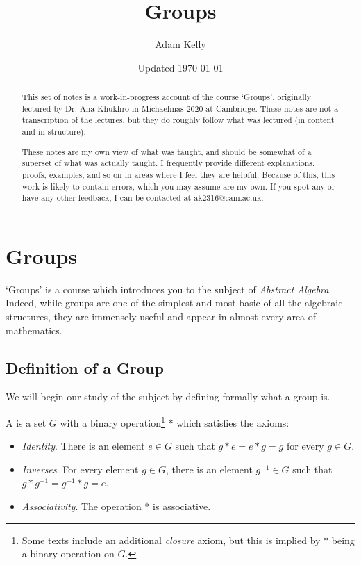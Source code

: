 \documentclass[a4]{scrreprt}
\title{Groups}
\author{Adam Kelly}
\date{Updated \today}
\newcommand{\newchapter}{\chapter}
\newcommand{\newsection}{\section}
\begin{document}
\maketitle

\begin{abstract}
	This set of notes is a work-in-progress account of the course `Groups', originally lectured by Dr. Ana Khukhro in Michaelmas 2020 at Cambridge. These notes are not a transcription of the lectures, but they do roughly follow what was lectured (in content and in structure).

	These notes are my own view of what was taught, and should be somewhat of a superset of what was actually taught. I frequently provide different explanations, proofs, examples, and so on in areas where I feel they are helpful. Because of this, this work is likely to contain errors, which you may assume are my own. If you spot any or have any other feedback, I can be contacted at \href{mailto:ak2316@cam.ac.uk}{ak2316@cam.ac.uk}.
\end{abstract}

\tableofcontents



\newchapter{Groups}

`Groups' is a course which introduces you to the subject of \emph{Abstract Algebra}.
Indeed, while groups are one of the simplest and most basic of all the algebraic structures, they are immensely useful and appear in almost every area of mathematics. 

\newsection{Definition of a Group}

We will begin our study of the subject by defining formally what a group is.

\begin{definition}[Group]
	A  is a set $G$ with a binary operation\footnote{Some texts include an additional \emph{closure} axiom, but this is implied by $*$ being a binary operation on $G$.} $*$ which satisfies the axioms:
	\begin{itemize}
		\item \emph{Identity}. There is an element $e \in G$ such that $g * e = e * g = g$ for every $g \in G$.
		\item \emph{Inverses}. For every element $g \in G$, there is an element $g^{-1} \in G$ such that $g * g^{-1} = g^{-1} * g = e$.
		\item \emph{Associativity}. The operation $*$ is associative.
	\end{itemize}
\end{definition}
\end{document}
